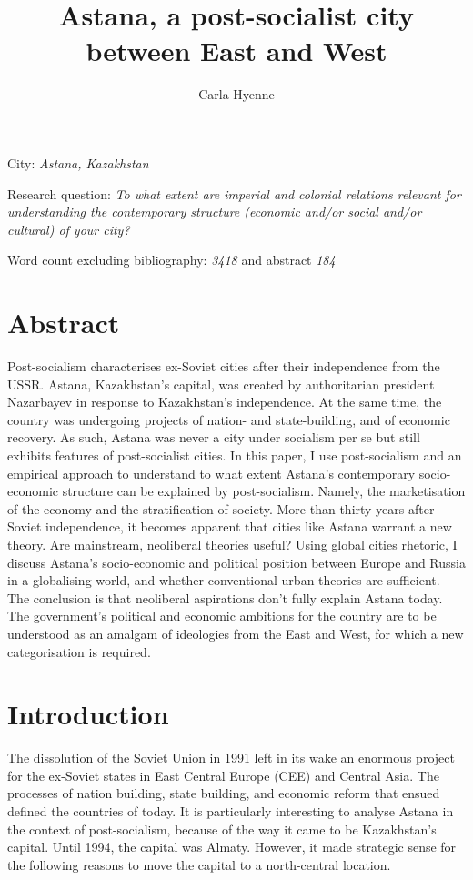 \documentclass{article}
\title{Astana, a post-socialist city between East and West}
\author{Carla Hyenne}
\date{}
\begin{document}
\maketitle 

City: \textit{Astana, Kazakhstan}

Research question: \textit{To what extent are imperial and colonial relations relevant for understanding the contemporary structure (economic and/or social and/or cultural) of your city?}

Word count excluding bibliography: \textit{3418} and abstract \textit{184} 

\section{Abstract}

Post-socialism characterises ex-Soviet cities after their independence from the USSR.
Astana, Kazakhstan's capital, was created by authoritarian president Nazarbayev in response to Kazakhstan's independence. At the same time, the country was undergoing projects of nation- and state-building, and of economic recovery. As such, Astana was never a city under socialism per se but still exhibits features of post-socialist cities. In this paper, I use post-socialism and an empirical approach to understand to what extent Astana's contemporary socio-economic structure can be explained by post-socialism. 
Namely, the marketisation of the economy and the stratification of society.
More than thirty years after Soviet independence, it becomes apparent that cities like Astana warrant a new theory. 
Are mainstream, neoliberal theories useful? Using global cities rhetoric, I discuss Astana's socio-economic and political position between Europe and Russia in a globalising world, and whether conventional urban theories are sufficient. 
The conclusion is that neoliberal aspirations don't fully explain Astana today. The government's political and economic ambitions for the country are to be understood as an amalgam of ideologies from the East and West, for which a new categorisation is required.

\pagebreak

\section{Introduction} 

The dissolution of the Soviet Union in 1991 left in its wake an enormous project for the ex-Soviet states in East Central Europe (CEE) and Central Asia. The processes of nation building, state building, and economic reform that ensued defined the countries of today. It is particularly interesting to analyse Astana in the context of post-socialism, because of the way it came to be Kazakhstan's capital. 
Until 1994, the capital was Almaty. However, it made strategic sense for the following reasons to move the capital to a north-central location. 
\end{document}
